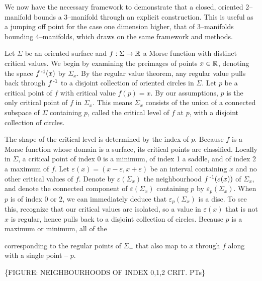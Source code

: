 \label{sec:2bound3}

We now have the necessary framework to demonstrate that a closed, oriented 2--manifold bounds a 3--manifold through an explicit construction.
This is useful as a jumping off point for the case one dimension higher, that of 3--manifolds bounding 4--manifolds, which draws on the same framework and methods.

Let $\Sigma$ be an oriented surface and $f:\Sigma\to\mathbb{R}$ a Morse function with distinct critical values.
We begin by examining the preimages of points $x\in\mathbb{R}$, denoting the space $f^{\,\text{-}1}(x)$ by $\Sigma_x$.
By the regular value theorem, any regular value pulls back through $f^{\,\text{-}1}$ to a disjoint collection of oriented circles in $\Sigma$.
Let $p$ be a critical point of $f$ with critical value $f(p)=x$.
By our assumptions, $p$ is the only critical point of $f$ in $\Sigma_x$.
This means $\Sigma_x$ consists of the union of a connected subspace of $\Sigma$ containing $p$, called the critical level of $f$ at $p$, with a disjoint collection of circles.

The shape of the critical level is determined by the index of $p$.
Because $f$ is a Morse function whose domain is a surface, its critical points are classified.
Locally in $\Sigma$, a critical point of index 0 is a minimum, of index 1 a saddle, and of index 2 a maximum of $f$.
Let $\varepsilon(x)=(x-\varepsilon,x+\varepsilon)$ be an interval containing $x$ and no other critical values of $f$.
Denote by $\varepsilon(\Sigma_x)$ the neighbourhood $f^{\,\text{-}1}(\varepsilon(x))$ of $\Sigma_x$, and denote the connected component of $\varepsilon(\Sigma_x)$ containing $p$ by $\varepsilon_p(\Sigma_x)$.
When $p$ is of index 0 or 2, we can immediately deduce that $\varepsilon_p(\Sigma_x)$ is a disc.
To see this, recognize that our critical values are isolated, so a value in $\varepsilon(x)$ that is not $x$ is regular, hence pulls back to a disjoint collection of circles.
Because $p$ is a maximum or minimum, all of the 

 corresponding to the regular points of $\Sigma_-$ that also map to $x$ through $f$ along with a single point -- $p$.

\{FIGURE: NEIGHBOURHOODS OF INDEX 0,1,2 CRIT. PTs\}

